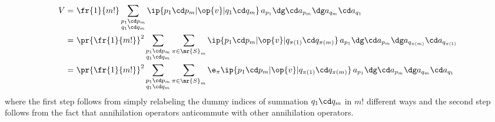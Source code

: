 \documentclass[11pt,fleqn]{article}
\numberwithin{equation}{section}
\begin{document}
\begin{prop}
{  \begin{align*}
    V
  =&\
    \fr{1}{m!}
    \sum_{\substack{p_1\cd p_m\\q_1\cd q_m}}
    \ip{p_1\cd p_m|\op{v}|q_1\cd q_m}\,
    a_{p_1}\dg\cd a_{p_m}\dg a_{q_m}\cd a_{q_1}
  \\=&\
    \pr{\fr{1}{m!}}^2
    \sum_{\substack{p_1\cd p_m\\q_1\cd q_m}}
    \sum_{\pi\in\mr{S}_m}
    \ip{p_1\cd p_m|\op{v}|q_{\pi(1)}\cd q_{\pi(m)}}\,
    a_{p_1}\dg\cd a_{p_m}\dg
    a_{q_{\pi(m)}}\cd a_{q_{\pi(1)}}
  \\=&\
    \pr{\fr{1}{m!}}^2
    \sum_{\substack{p_1\cd p_m\\q_1\cd q_m}}
    \sum_{\pi\in\mr{S}_m}
    \e_{\pi}
    \ip{p_1\cd p_m|\op{v}|q_{\pi(1)}\cd q_{\pi(m)}}\,
    a_{p_1}\dg\cd a_{p_m}\dg
    a_{q_m}\cd a_{q_1}
  \end{align*}
  where the first step follows from simply relabeling the dummy indices of summation $q_1\cd q_m$ in $m!$ different ways and the second step follows from the fact that annihilation operators anticommute with other annihilation operators.
}
\end{prop}
\end{document}
